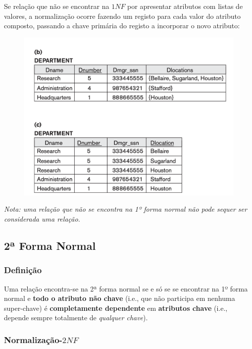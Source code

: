 \documentclass[oneside]{book}
\theoremstyle{definition}
\begin{document}
Se relação que não se encontrar na $1NF$ por apresentar atributos com listas de valores, a normalização ocorre fazendo um registo para cada valor do atributo composto, passando a chave primária do registo a incorporar o novo atributo:

\begin{figure}[h]
    \centering
    \includegraphics[scale = 0.4]{cap_norm/1nf_3.png}
\end{figure}

\textit{Nota: uma relação que não se encontra na 1º forma normal não pode sequer ser considerada uma relação.}

\subsection{2ª Forma Normal}

\subsubsection*{Definição}

Uma relação encontra-se na 2ª forma normal se e só se se encontrar na 1º forma normal e \textbf{todo o atributo não chave} (i.e., que não participa em nenhuma super-chave) é \textbf{completamente dependente} em \textbf{atributos chave} (i.e., depende sempre totalmente de \textit{qualquer chave}).

\subsubsection*{Normalização-$2NF$}
\end{document}
